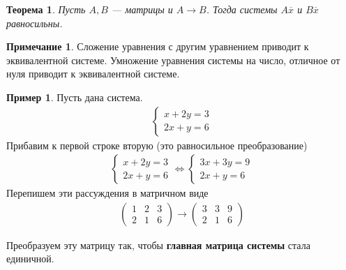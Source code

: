 \documentclass[]{article}
\theoremstyle{theorem}
\newtheorem{thr}{Теорема}
\theoremstyle{definition}
\newtheorem{ex}{Пример}
\newtheorem*{nt}{Примечание}
\begin{document}
\begin{thr}
	Пусть $A,B$ --- матрицы и $A\rightarrow B$. Тогда системы $A\overline{x}$ и $B\overline{x}$ равносильны.
\end{thr}

\begin{nt}
	Сложение уравнения с другим уравнением приводит к эквивалентной системе. Умножение уравнения системы на число, отличное от нуля приводит к эквивалентной системе.
\end{nt}

\begin{ex}\label{ex1}
	Пусть дана система. 
\begin{gather*}
	\begin{cases}
		x+2y=3
		\\
		2x+y=6
	\end{cases}
\end{gather*}
Прибавим к первой строке вторую (это равносильное преобразование)
\begin{gather*}
	\begin{cases}
		x+2y=3
		\\
		2x+y=6
	\end{cases}
	\Leftrightarrow 
	\begin{cases}
		3x+3y=9
		\\
		2x+y=6
	\end{cases}
\end{gather*}
Перепишем эти рассуждения в матричном виде
\begin{gather*}
	\left(
	\begin{array}{ll|l}
		1 & 2 & 3
		\\
		2 & 1 & 6
	\end{array}
	\right)
	\rightarrow
	\left(
	\begin{array}{ll|l}
		3 & 3 & 9
		\\
		2 & 1 & 6
	\end{array}
	\right)
\end{gather*}

Преобразуем эту матрицу так, чтобы \textbf{главная матрица системы} стала единичной.


\end{ex}
\end{document}
